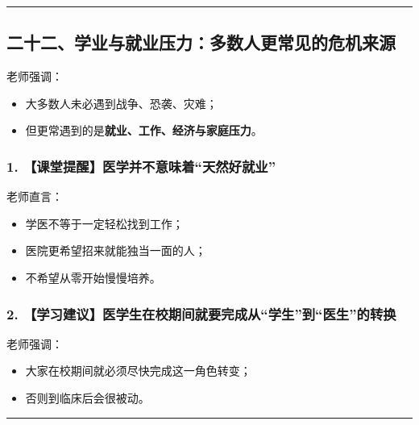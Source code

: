 \documentclass[
  chinese,
  9pt,
  a4paper,
]{ctexart}
\providecommand{\tightlist}{%
  \setlength{\itemsep}{0pt}\setlength{\parskip}{0pt}}
\begin{document}
\begin{center}\rule{0.5\linewidth}{0.5pt}\end{center}

\subsection{二十二、学业与就业压力：多数人更常见的危机来源}\label{ux4e8cux5341ux4e8cux5b66ux4e1aux4e0eux5c31ux4e1aux538bux529bux591aux6570ux4ebaux66f4ux5e38ux89c1ux7684ux5371ux673aux6765ux6e90}

老师强调：

\begin{itemize}
\tightlist
\item
  大多数人未必遇到战争、恐袭、灾难；
\item
  但更常遇到的是\textbf{就业、工作、经济与家庭压力}。
\end{itemize}

\subsubsection{1.
【课堂提醒】医学并不意味着``天然好就业''}\label{ux8bfeux5802ux63d0ux9192ux533bux5b66ux5e76ux4e0dux610fux5473ux7740ux5929ux7136ux597dux5c31ux4e1a}

老师直言：

\begin{itemize}
\tightlist
\item
  学医不等于一定轻松找到工作；
\item
  医院更希望招来就能独当一面的人；
\item
  不希望从零开始慢慢培养。
\end{itemize}

\subsubsection{2.
【学习建议】医学生在校期间就要完成从``学生''到``医生''的转换}\label{ux5b66ux4e60ux5efaux8baeux533bux5b66ux751fux5728ux6821ux671fux95f4ux5c31ux8981ux5b8cux6210ux4eceux5b66ux751fux5230ux533bux751fux7684ux8f6cux6362}

老师强调：

\begin{itemize}
\tightlist
\item
  大家在校期间就必须尽快完成这一角色转变；
\item
  否则到临床后会很被动。
\end{itemize}

\begin{center}\rule{0.5\linewidth}{0.5pt}\end{center}
\end{document}
